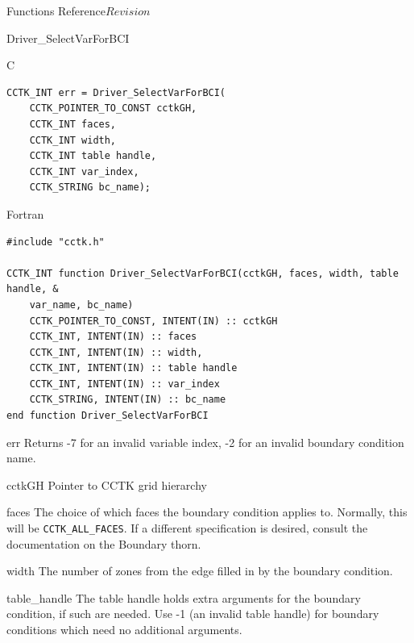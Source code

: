 \begin{cactuspart}{ Functions Reference}{}{$Revision$}
\begin{FunctionDescription}{Driver\_SelectVarForBCI}
\begin{SynopsisSection}
\begin{Synopsis}{C}
\begin{verbatim}
CCTK_INT err = Driver_SelectVarForBCI(
    CCTK_POINTER_TO_CONST cctkGH,
    CCTK_INT faces,
    CCTK_INT width,
    CCTK_INT table handle,
    CCTK_INT var_index,
    CCTK_STRING bc_name);

\end{verbatim}
\end{Synopsis}
\begin{Synopsis}{Fortran}
\begin{verbatim}
#include "cctk.h"

CCTK_INT function Driver_SelectVarForBCI(cctkGH, faces, width, table handle, &
    var_name, bc_name)
    CCTK_POINTER_TO_CONST, INTENT(IN) :: cctkGH
    CCTK_INT, INTENT(IN) :: faces
    CCTK_INT, INTENT(IN) :: width,
    CCTK_INT, INTENT(IN) :: table handle
    CCTK_INT, INTENT(IN) :: var_index
    CCTK_STRING, INTENT(IN) :: bc_name
end function Driver_SelectVarForBCI
\end{verbatim}
\end{Synopsis}
\end{SynopsisSection}

\begin{ResultSection}
\begin{Result}{err}
Returns -7 for an invalid variable index, -2 for an invalid boundary condition name.
\end{Result}
\end{ResultSection}

\begin{ParameterSection}
\begin{Parameter}{cctkGH}
Pointer to CCTK grid hierarchy
\end{Parameter}

\begin{Parameter}{faces}
The choice of which faces the boundary condition applies to.
Normally, this will be \texttt{CCTK\_ALL\_FACES}. If a different
specification is desired, consult the documentation on the
Boundary thorn.
\end{Parameter}

\begin{Parameter}{width}
The number of zones from the edge filled in by the boundary condition.
\end{Parameter}

\begin{Parameter}{table\_handle}
The table handle holds extra arguments for the boundary condition, if such are needed. Use
-1 (an invalid table handle) for boundary conditions which need no additional arguments.
\end{Parameter}


\end{ParameterSection}
\end{FunctionDescription}
\end{cactuspart}
